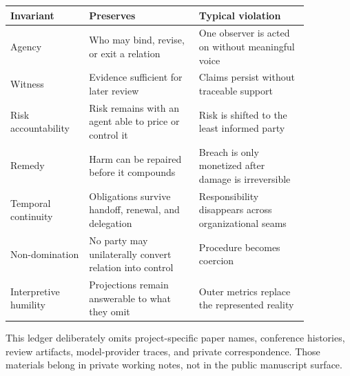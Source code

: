 \begin{center}
\begin{tabular}{p{0.22\linewidth}p{0.32\linewidth}p{0.32\linewidth}}
\hline
\textbf{Invariant} & \textbf{Preserves} & \textbf{Typical violation} \\
\hline
Agency & Who may bind, revise, or exit a relation & One observer is acted on
without meaningful voice \\
Witness & Evidence sufficient for later review & Claims persist without
traceable support \\
Risk accountability & Risk remains with an agent able to price or control it &
Risk is shifted to the least informed party \\
Remedy & Harm can be repaired before it compounds & Breach is only monetized
after damage is irreversible \\
Temporal continuity & Obligations survive handoff, renewal, and delegation &
Responsibility disappears across organizational seams \\
Non-domination & No party may unilaterally convert relation into control &
Procedure becomes coercion \\
Interpretive humility & Projections remain answerable to what they omit &
Outer metrics replace the represented reality \\
\hline
\end{tabular}
\end{center}

\begin{remark}
This ledger deliberately omits project-specific paper names, conference
histories, review artifacts, model-provider traces, and private correspondence.
Those materials belong in private working notes, not in the public manuscript
surface.
\end{remark}
